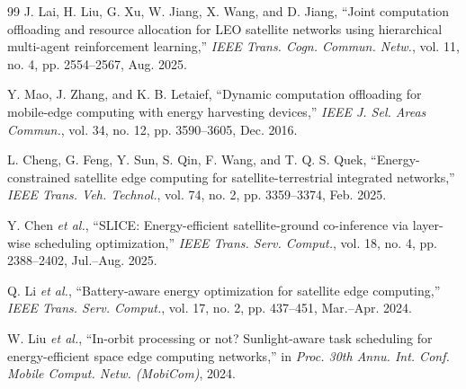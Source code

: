 \documentclass[a4paper,11pt]{article}
\begin{document}
\begin{thebibliography}{99}
J. Lai, H. Liu, G. Xu, W. Jiang, X. Wang, and D. Jiang,
``Joint computation offloading and resource allocation for LEO
satellite networks using hierarchical multi-agent reinforcement learning,''
\textit{IEEE Trans. Cogn. Commun. Netw.},
vol. 11, no. 4, pp. 2554--2567, Aug. 2025.

Y. Mao, J. Zhang, and K. B. Letaief,
``Dynamic computation offloading for mobile-edge computing with
energy harvesting devices,''
\textit{IEEE J. Sel. Areas Commun.},
vol. 34, no. 12, pp. 3590--3605, Dec. 2016.

L. Cheng, G. Feng, Y. Sun, S. Qin, F. Wang, and T. Q. S. Quek,
``Energy-constrained satellite edge computing for satellite-terrestrial
integrated networks,''
\textit{IEEE Trans. Veh. Technol.},
vol. 74, no. 2, pp. 3359--3374, Feb. 2025.

Y. Chen \textit{et al.},
``SLICE: Energy-efficient satellite-ground co-inference via layer-wise
scheduling optimization,''
\textit{IEEE Trans. Serv. Comput.},
vol. 18, no. 4, pp. 2388--2402, Jul.--Aug. 2025.

Q. Li \textit{et al.},
``Battery-aware energy optimization for satellite edge computing,''
\textit{IEEE Trans. Serv. Comput.},
vol. 17, no. 2, pp. 437--451, Mar.--Apr. 2024.

W. Liu \textit{et al.},
``In-orbit processing or not? Sunlight-aware task scheduling for
energy-efficient space edge computing networks,''
in \textit{Proc. 30th Annu. Int. Conf. Mobile Comput. Netw. (MobiCom)}, 2024.

\end{thebibliography}
\end{document}
